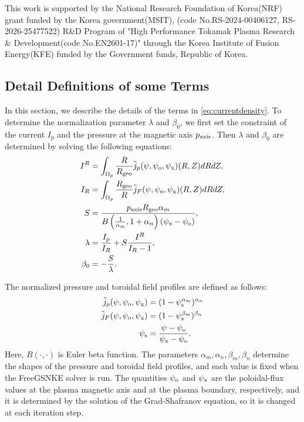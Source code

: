 \begin{acknowledgements}
  This work is supported by the National Research Foundation of Korea(NRF) grant funded by the Korea government(MSIT), (code No.RS-2024-00406127, RS-2026-25477522)
  R\&D Program of "High Performance Tokamak Plasma Research \& Development(code No.EN2601-17)" through the Korea Institute of Fusion Energy(KFE) funded by the Government funds, Republic of Korea.
\end{acknowledgements}



\begin{appendix}
  \section{Detail Definitions of some Terms}\label{sec:normalization}
  In this section, we describe the details of the terms in \eqref{eq:currentdensity}.
  To determine the normalization parameter $\lambda$ and $\beta_0$, we first
  set the constraint of the current $I_p$ and the pressure at the magnetic axis $p_{\text{axis}}$.
  Then $\lambda$ and $\beta_0$ are determined by solving the following equations:
  \begin{align*}
    I^R &= \int_{\Omega_p} \frac{R}{R_{\text{geo}}} \tilde{j}_p(\psi, \psi_{\text{o}}, \psi_{\text{x}})(R, Z) dR dZ, \\
    I_R &= \int_{\Omega_p} \frac{R_{\text{geo}}}{R} \tilde{j}_F(\psi, \psi_{\text{o}}, \psi_{\text{x}})(R, Z) dR dZ, \\
    S &= \frac{p_{\text{axis}} R_{\text{geo}}\alpha_m}
    {B\left(\frac{1}{\alpha_m}, 1 + \alpha_n\right)(\psi_{\text{x}} - \psi_{\text{o}})}, \\
    \lambda &= \frac{I_p}{I_R} + S \frac{I^R}{I_R - 1}, \\
    \beta_0 &= -\frac{S}{\lambda}.
  \end{align*}

  The normalized pressure and toroidal field profiles are defined as follows:
  \begin{align*}
    \tilde{j}_p(\psi, \psi_{\text{o}}, \psi_{\text{x}}) &= (1 - \psi_{\text{s}}^{\alpha_m})^{\alpha_n} \\
    \tilde{j}_F(\psi, \psi_{\text{o}}, \psi_{\text{x}}) &= (1 - \psi_{\text{s}}^{\beta_m})^{\beta_n} \\
    \psi_{\text{s}} &= \frac{\psi - \psi_{\text{o}}}{\psi_{\text{x}} - \psi_{\text{o}}}. \\
  \end{align*}
  Here, $B(\cdot, \cdot)$ is Euler beta function.
  The parameters $\alpha_m, \alpha_n, \beta_m, \beta_n$ determine  
  the shapes of the pressure and toroidal field profiles,
  and each value is fixed when the FreeGSNKE solver is run.
  The quantities $\psi_{\text{o}}$ and $\psi_{\text{x}}$ are the poloidal-flux values
  at the plasma magnetic axis and at the plasma boundary, respectively,
  and it is determined by the solution of the Grad-Shafranov equation, 
  so it is changed at each iteration step. 


\end{appendix}
